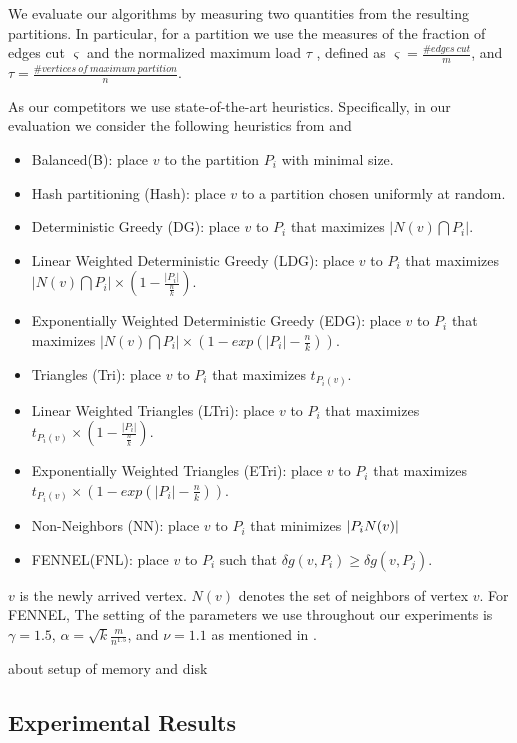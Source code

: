 \documentclass{sig-alternate-2013}
\begin{document}
We evaluate our algorithms by measuring two quantities from the resulting partitions.
In particular, for a partition we use the measures of the fraction of edges cut $\varsigma$
and the normalized maximum load $\tau$ \cite{Charalampos:fennel}, defined as
$\varsigma = \frac{\# edges\ cut}{m}$, and $\tau = \frac{\# vertices\ of\ maximum\ partition}{n}$.

As our competitors we use state-of-the-art heuristics.
Specifically, in our evaluation we consider the following heuristics from \cite{Stanton:streampartition} and \cite{Charalampos:fennel}
\begin{itemize}
  \item Balanced(B): place $v$ to the partition $P_i$ with minimal size.
  \item Hash partitioning (Hash): place $v$ to a partition chosen uniformly at random.
  \item Deterministic Greedy (DG): place $v$ to $P_i$ that maximizes $|N(v)\bigcap P_i|$.
  \item Linear Weighted Deterministic Greedy (LDG): place $v$ to $P_i$ that maximizes $|N(v)\bigcap P_i|\times (1-\frac{|P_i|}{\frac{n}{k}})$.
  \item Exponentially Weighted Deterministic Greedy (EDG): place $v$ to $P_i$ that maximizes $|N(v)\bigcap P_i|\times (1-exp(|P_i|-\frac{n}{k}))$.
  \item Triangles (Tri): place $v$ to $P_i$ that maximizes $t_{P_i(v)}$.
  \item Linear Weighted Triangles (LTri): place $v$ to $P_i$ that maximizes $t_{P_i(v)}\times (1-\frac{|P_i|}{\frac{n}{k}})$.
  \item Exponentially Weighted Triangles (ETri): place $v$ to $P_i$ that maximizes $t_{P_i(v)}\times (1-exp(|P_i|-\frac{n}{k}))$.
  \item Non-Neighbors (NN): place $v$ to $P_i$ that minimizes $|P_i\\N(v)|$
  \item FENNEL(FNL): place $v$ to $P_i$ such that $\delta g(v, P_i)\geq \delta g(v, P_j)$.
\end{itemize}
$v$ is the newly arrived vertex. $N(v)$ denotes the set of neighbors of vertex $v$. For FENNEL, The setting of the parameters we use throughout our experiments is $\gamma=1.5$, $ \alpha=\sqrt{k}\frac{m}{n^{1.5}}$, and $\nu = 1.1$ as mentioned in \cite{Charalampos:fennel}.

about setup of memory and disk



\subsection{Experimental Results}\label{ch_experiment_result}
\end{document}

